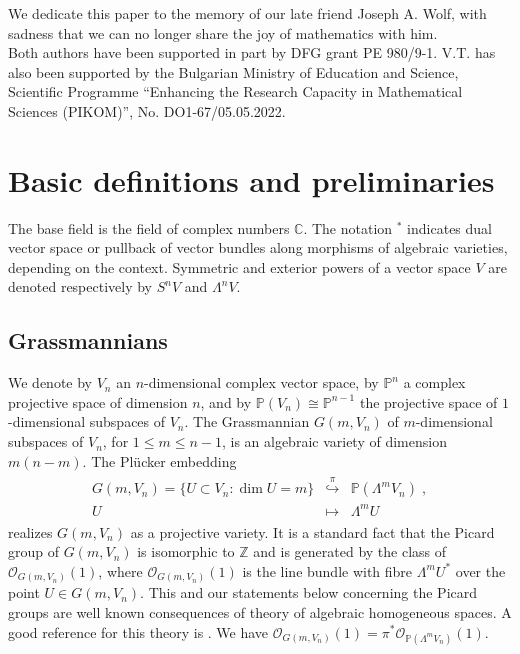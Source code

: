 \documentclass[12pt]{amsart}
\def\CC {{\mathbb C}}     %
\def\PP {{\mathbb P}}     %
\def\ZZ {{\mathbb Z}}     %
\def\mc {\mathcal}
\begin{document}
We dedicate this paper to the memory of our late friend Joseph A. Wolf, with sadness that we can no longer share the joy of mathematics with him.\\

 Both authors have been supported in part by DFG grant PE 980/9-1. V.T. has also been supported by the Bulgarian Ministry of Education and Science, Scientific Programme ``Enhancing the Research Capacity in Mathematical Sciences (PIKOM)'', No. DO1-67/05.05.2022.


\section{Basic definitions and preliminaries}\label{Sec Basic Notions}

The base field is the field of complex numbers $\CC$. The notation ${}^*$ indicates dual vector space or pullback of vector bundles along morphisms of algebraic varieties, depending on the context. Symmetric and exterior powers of a vector space $V$ are denoted respectively by $S^nV$ and $\Lambda^nV$.

\subsection{Grassmannians}\label{Sec Grassmannians}

We denote by $V_n$ an $n$-dimensional complex vector space, by $\PP^n$ a complex projective space of dimension $n$, and by $\PP(V_n)\cong\PP^{n-1}$ the projective space of $1$-dimensional subspaces of $V_n$. The Grassmannian $G(m,V_n)$ of $m$-dimensional subspaces of $V_n$, for $1\leq m\leq n-1$, is an algebraic variety of dimension $m(n-m)$. The Pl\"ucker embedding
\begin{gather*}
\begin{array}{rcl}
G(m,V_{n})=\{ U\subset V_n : \dim U= m\} & \stackrel{\pi}{\hookrightarrow} & \PP(\Lambda^m V_n)\;, \\
U & \mapsto & \Lambda^m U
\end{array}
\end{gather*}
realizes $G(m,V_n)$ as a projective variety. It is a standard fact that the Picard group of $G(m,V_n)$ is isomorphic to $\ZZ$ and is generated by the class of $\mc O_{G(m,V_{n})}(1)$, where $\mc O_{G(m,V_{n})}(1)$ is the line bundle with fibre $\Lambda^m U^*$ over the point $U\in G(m,V_n)$. This and our statements below concerning the Picard groups are well known consequences of theory of algebraic homogeneous spaces. A good reference for this theory is \cite{KKV}. We have $\mc O_{G(m,V_{n})}(1)=\pi^*\mc O_{\PP(\Lambda^m V_n)}(1)$.
\end{document}
